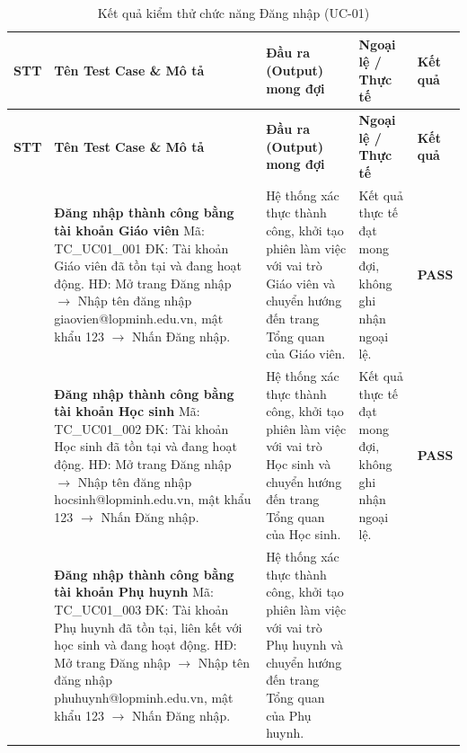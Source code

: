 \vspace{0.4em}
\begin{longtable}{|>{\centering\arraybackslash}p{0.8cm}|>{\raggedright\arraybackslash}p{4.6cm}|>{\raggedright\arraybackslash}p{3.8cm}|>{\raggedright\arraybackslash}p{3.8cm}|>{\centering\arraybackslash}p{1.5cm}|}
\caption{Kết quả kiểm thử chức năng Đăng nhập (UC-01)}\label{tab:test-uc01}\\
\hline
\textbf{STT} & \textbf{Tên Test Case \& Mô tả} & \textbf{Đầu ra (Output) mong đợi} & \textbf{Ngoại lệ / Thực tế} & \textbf{Kết quả} \\
\hline
\endfirsthead
\hline
\textbf{STT} & \textbf{Tên Test Case \& Mô tả} & \textbf{Đầu ra (Output) mong đợi} & \textbf{Ngoại lệ / Thực tế} & \textbf{Kết quả} \\
\hline
\endhead
1 & \textbf{Đăng nhập thành công bằng tài khoản Giáo viên}\newline
Mã: TC\_UC01\_001\newline
ĐK: Tài khoản Giáo viên đã tồn tại và đang hoạt động.\newline
HĐ: Mở trang Đăng nhập $\rightarrow$ Nhập tên đăng nhập giaovien@lopminh.edu.vn, mật khẩu 123 $\rightarrow$ Nhấn Đăng nhập. &
Hệ thống xác thực thành công, khởi tạo phiên làm việc với vai trò Giáo viên và chuyển hướng đến trang Tổng quan của Giáo viên. &
Kết quả thực tế đạt mong đợi, không ghi nhận ngoại lệ. & \textbf{PASS} \\
\hline
2 & \textbf{Đăng nhập thành công bằng tài khoản Học sinh}\newline
Mã: TC\_UC01\_002\newline
ĐK: Tài khoản Học sinh đã tồn tại và đang hoạt động.\newline
HĐ: Mở trang Đăng nhập $\rightarrow$ Nhập tên đăng nhập hocsinh@lopminh.edu.vn, mật khẩu 123 $\rightarrow$ Nhấn Đăng nhập. &
Hệ thống xác thực thành công, khởi tạo phiên làm việc với vai trò Học sinh và chuyển hướng đến trang Tổng quan của Học sinh. &
Kết quả thực tế đạt mong đợi, không ghi nhận ngoại lệ. & \textbf{PASS} \\
\hline
3 & \textbf{Đăng nhập thành công bằng tài khoản Phụ huynh}\newline
Mã: TC\_UC01\_003\newline
ĐK: Tài khoản Phụ huynh đã tồn tại, liên kết với học sinh và đang hoạt động.\newline
HĐ: Mở trang Đăng nhập $\rightarrow$ Nhập tên đăng nhập phuhuynh@lopminh.edu.vn, mật khẩu 123 $\rightarrow$ Nhấn Đăng nhập. &
Hệ thống xác thực thành công, khởi tạo phiên làm việc với vai trò Phụ huynh và chuyển hướng đến trang Tổng quan của Phụ huynh. &

\end{longtable}
